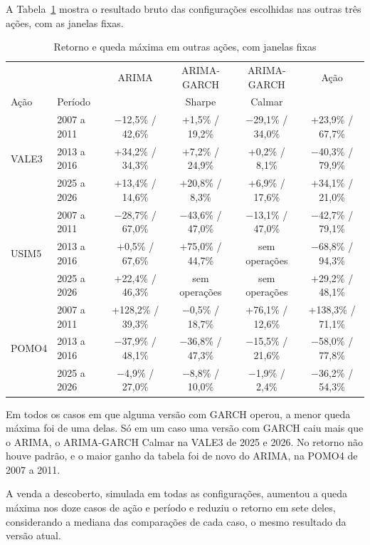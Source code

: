 A Tabela~\ref{tab:outras-j} mostra o resultado bruto das configurações escolhidas
nas outras três ações, com as janelas fixas.

\begin{table}[htbp]
\centering
\caption{Retorno e queda máxima em outras ações, com janelas fixas}
\label{tab:outras-j}
\fontsize{10}{12}\selectfont
\begin{tabular}{l|l|c|c|c|c}
\hline
& & ARIMA & ARIMA-GARCH & ARIMA-GARCH & Ação \\
Ação & Período & & Sharpe & Calmar & \\
\hline
\multirow{3}{*}{VALE3} & 2007 a 2011 & $-$12,5\% / 42,6\% & +1,5\% / 19,2\% & $-$29,1\% / 34,0\% & +23,9\% / 67,7\% \\
 & 2013 a 2016 & +34,2\% / 34,3\% & +7,2\% / 24,9\% & +0,2\% / 8,1\% & $-$40,3\% / 79,9\% \\
 & 2025 a 2026 & +13,4\% / 14,6\% & +20,8\% / 8,3\% & +6,9\% / 17,6\% & +34,1\% / 21,0\% \\
\hline
\multirow{3}{*}{USIM5} & 2007 a 2011 & $-$28,7\% / 67,0\% & $-$43,6\% / 47,0\% & $-$13,1\% / 47,0\% & $-$42,7\% / 79,1\% \\
 & 2013 a 2016 & +0,5\% / 67,6\% & +75,0\% / 44,7\% & sem operações & $-$68,8\% / 94,3\% \\
 & 2025 a 2026 & +22,4\% / 46,3\% & sem operações & sem operações & +29,2\% / 48,1\% \\
\hline
\multirow{3}{*}{POMO4} & 2007 a 2011 & +128,2\% / 39,3\% & $-$0,5\% / 18,7\% & +76,1\% / 12,6\% & +138,3\% / 71,1\% \\
 & 2013 a 2016 & $-$37,9\% / 48,1\% & $-$36,8\% / 47,3\% & $-$15,5\% / 21,6\% & $-$58,0\% / 77,8\% \\
 & 2025 a 2026 & $-$4,9\% / 27,0\% & $-$8,8\% / 10,0\% & $-$1,9\% / 2,4\% & $-$36,2\% / 54,3\% \\
\hline
\end{tabular}
\end{table}

Em todos os casos em que alguma versão com GARCH operou, a menor queda máxima foi
de uma delas. Só em um caso uma versão com GARCH caiu mais que o ARIMA, o
ARIMA-GARCH Calmar na VALE3 de 2025 e 2026. No retorno não houve padrão, e o maior
ganho da tabela foi de novo do ARIMA, na POMO4 de 2007 a 2011.

A venda a descoberto, simulada em todas as configurações, aumentou a queda máxima
nos doze casos de ação e período e reduziu o retorno em sete deles, considerando a
mediana das comparações de cada caso, o mesmo resultado da versão atual.

